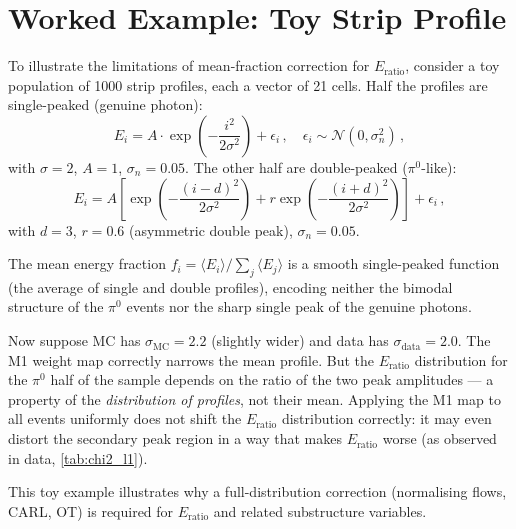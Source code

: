 \documentclass[11pt,a4paper]{article}
\newcommand{\Eratio}{E_{\mathrm{ratio}}}
\begin{document}
\section{Worked Example: Toy Strip Profile}
\label{app:toy}

To illustrate the limitations of mean-fraction correction for $\Eratio$,
consider a toy population of 1000 strip profiles, each a vector of
21 cells.  Half the profiles are single-peaked (genuine photon):
\begin{equation}
  E_i = A \cdot \exp\!\left(-\frac{i^2}{2\sigma^2}\right) + \epsilon_i\,,
  \quad \epsilon_i \sim \mathcal{N}(0, \sigma_n^2)\,,
  \label{eq:toy:single}
\end{equation}
with $\sigma = 2$, $A = 1$, $\sigma_n = 0.05$.  The other half are
double-peaked ($\pi^0$-like):
\begin{equation}
  E_i = A \left[
    \exp\!\left(-\frac{(i-d)^2}{2\sigma^2}\right)
    + r\exp\!\left(-\frac{(i+d)^2}{2\sigma^2}\right)
  \right] + \epsilon_i\,,
  \label{eq:toy:double}
\end{equation}
with $d = 3$, $r = 0.6$ (asymmetric double peak), $\sigma_n = 0.05$.

The mean energy fraction $f_i = \langle E_i \rangle / \sum_j \langle E_j \rangle$
is a smooth single-peaked function (the average of single and double
profiles), encoding neither the bimodal structure of the $\pi^0$
events nor the sharp single peak of the genuine photons.

Now suppose MC has $\sigma_\mathrm{MC} = 2.2$ (slightly wider) and
data has $\sigma_\mathrm{data} = 2.0$.  The M1 weight map correctly
narrows the mean profile.  But the $\Eratio$ distribution for the
$\pi^0$ half of the sample depends on the ratio of the two peak
amplitudes — a property of the \emph{distribution of profiles},
not their mean.  Applying the M1 map to all events uniformly does
not shift the $\Eratio$ distribution correctly: it may even distort
the secondary peak region in a way that makes $\Eratio$ worse
(as observed in data, \cref{tab:chi2_l1}).

This toy example illustrates why a full-distribution correction
(normalising flows, CARL, OT) is required for $\Eratio$
and related substructure variables.

\printbibliography[heading=bibintoc,title={References}]
\end{document}
